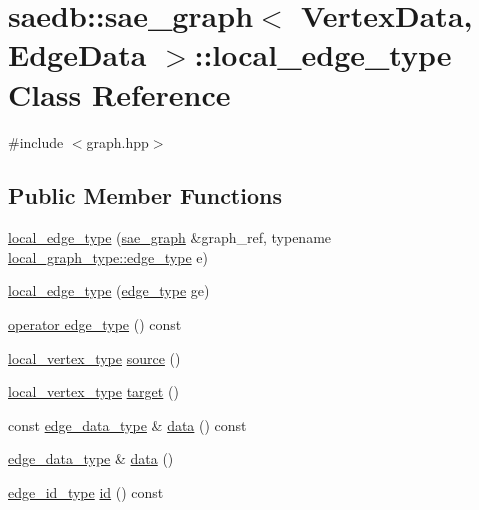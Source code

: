 \hypertarget{classsaedb_1_1sae__graph_1_1local__edge__type}{\section{saedb\-:\-:sae\-\_\-graph$<$ Vertex\-Data, Edge\-Data $>$\-:\-:local\-\_\-edge\-\_\-type Class Reference}
\label{d1/d46/classsaedb_1_1sae__graph_1_1local__edge__type}
}


{\ttfamily \#include $<$graph.\-hpp$>$}

\subsection*{Public Member Functions}
\begin{DoxyCompactItemize}
\item 
\hyperlink{classsaedb_1_1sae__graph_1_1local__edge__type_a851edab4f22ddb5c7ff048327ecdab53}{local\-\_\-edge\-\_\-type} (\hyperlink{classsaedb_1_1sae__graph}{sae\-\_\-graph} \&graph\-\_\-ref, typename \hyperlink{structsaedb_1_1local__graph_1_1edge__type}{local\-\_\-graph\-\_\-type\-::edge\-\_\-type} e)
\item 
\hyperlink{classsaedb_1_1sae__graph_1_1local__edge__type_ad6767a178f9d4ab8673b1b385b8525e7}{local\-\_\-edge\-\_\-type} (\hyperlink{classsaedb_1_1sae__graph_1_1edge__type}{edge\-\_\-type} ge)
\item 
\hyperlink{classsaedb_1_1sae__graph_1_1local__edge__type_ab7ff402a97f43602b7858878ee7d826b}{operator edge\-\_\-type} () const 
\item 
\hyperlink{structsaedb_1_1sae__graph_1_1local__vertex__type}{local\-\_\-vertex\-\_\-type} \hyperlink{classsaedb_1_1sae__graph_1_1local__edge__type_a1f7ab943553c31d6d8cbe59ba607c165}{source} ()
\item 
\hyperlink{structsaedb_1_1sae__graph_1_1local__vertex__type}{local\-\_\-vertex\-\_\-type} \hyperlink{classsaedb_1_1sae__graph_1_1local__edge__type_a8be78808d0c5ef936b0f2ef3d1cae954}{target} ()
\item 
const \hyperlink{classsaedb_1_1sae__graph_a3f786e0be3d855a988333235a6b50d02}{edge\-\_\-data\-\_\-type} \& \hyperlink{classsaedb_1_1sae__graph_1_1local__edge__type_a56e630a8d0054d3461c8a7163b9ba396}{data} () const 
\item 
\hyperlink{classsaedb_1_1sae__graph_a3f786e0be3d855a988333235a6b50d02}{edge\-\_\-data\-\_\-type} \& \hyperlink{classsaedb_1_1sae__graph_1_1local__edge__type_a3c0de93c59742237f4b9d464dc7d0dc3}{data} ()
\item 
\hyperlink{classsaedb_1_1sae__graph_a5f39a5f8d12ae17fd09fad90004229d7}{edge\-\_\-id\-\_\-type} \hyperlink{classsaedb_1_1sae__graph_1_1local__edge__type_a1a4f61ab341796a64e650e88be7828d7}{id} () const 
\end{DoxyCompactItemize}


